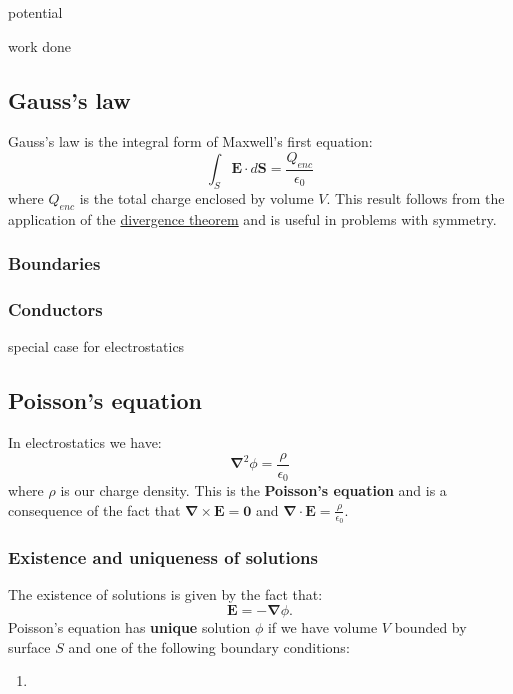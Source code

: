 \documentclass{article}
\begin{document}
potential

work done

\newpage

\subsection{Gauss's law}
Gauss's law is the integral form of Maxwell's first equation:
$$\int_S\boldsymbol{E}\cdot d\boldsymbol{S}
=\frac{Q_{enc}}{\epsilon_0}$$
where $Q_{enc}$ is the total charge enclosed by volume $V$. This result follows from the application of the \underline{divergence theorem} and is useful in problems with symmetry. 

\subsubsection{Boundaries}

\subsubsection{Conductors}
special case for electrostatics

\newpage

\subsection{Poisson's equation}
In electrostatics we have:
$$\boldsymbol{\nabla}^2\phi=\frac{\rho}{\epsilon_0}$$
where $\rho$ is our charge density. This is the \textbf{Poisson's equation}
and is a consequence of the fact that
$\boldsymbol{\nabla}\times\boldsymbol{E}=\boldsymbol{0}$ and
$\boldsymbol{\nabla}\cdot\boldsymbol{E}=\displaystyle\frac{\rho}{\epsilon_0}$.

\subsubsection{Existence and uniqueness of solutions}
The existence of solutions is given by the fact that:
$$\boldsymbol{E}=-\boldsymbol{\nabla}\phi.$$
Poisson's equation has \textbf{unique} solution $\phi$
if we have volume $V$ bounded by surface $S$
and one of the following boundary conditions:
\begin{enumerate}
    \item 
\end{enumerate}
\end{document}
